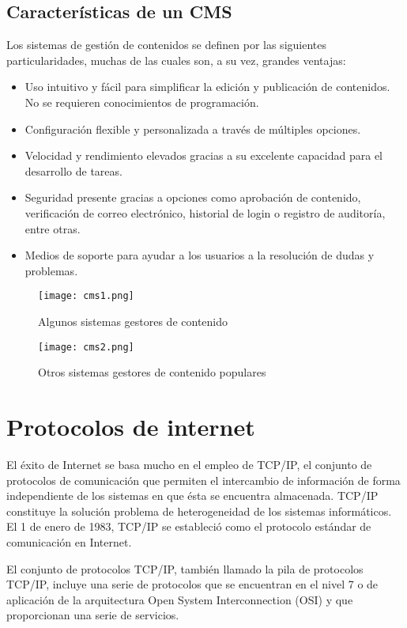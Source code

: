 \subsection{Características de un CMS}
Los sistemas de gestión de contenidos se definen por las siguientes particularidades, muchas de las cuales son, a su vez, grandes ventajas:

\begin{itemize}
	\item Uso intuitivo y fácil para simplificar la edición y publicación de contenidos. No se requieren conocimientos de programación.
	\item Configuración flexible y personalizada a través de múltiples opciones.
	\item Velocidad y rendimiento elevados gracias a su excelente capacidad para el desarrollo de tareas.
	\item Seguridad presente gracias a opciones como aprobación de contenido, verificación de correo electrónico, historial de login o registro de auditoría, entre otras.
	\item Medios de soporte para ayudar a los usuarios a la resolución de dudas y problemas.
\end{itemize}

\begin{figure}[H]
	\center
	\texttt{[image: cms1.png]}
	\caption{Algunos sistemas gestores de contenido}
	\label{fig:super}
\end{figure}

\begin{figure}[H]
	\center
	\texttt{[image: cms2.png]}
	\caption{Otros sistemas gestores de contenido populares}
	\label{fig:super}
\end{figure}

\section{Protocolos de internet} 
El éxito de Internet se basa mucho en el empleo de TCP/IP, el conjunto de protocolos de comunicación que permiten el intercambio de información de forma independiente de los sistemas en que ésta se encuentra almacenada. TCP/IP constituye
la solución problema de heterogeneidad de los sistemas informáticos. El 1 de enero de
1983, TCP/IP se estableció como el protocolo estándar de comunicación en Internet.

El conjunto de protocolos TCP/IP, también llamado la pila de protocolos
TCP/IP, incluye una serie de protocolos que se encuentran en el nivel 7 o de aplicación de la arquitectura Open System Interconnection (OSI) y que proporcionan una
serie de servicios.

